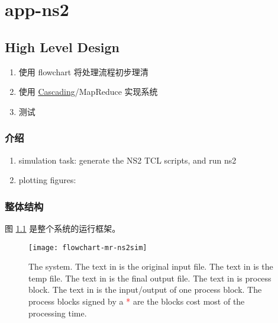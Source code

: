 %

\chapter{app-ns2}

\section{High Level Design}



\begin{enumerate}
  \item 使用 flowchart 将处理流程初步理清
  \item 使用 \href{http://www.cascading.org/}{Cascading}/MapReduce 实现系统
  \item 测试
\end{enumerate}


\subsection{介绍}

\begin{enumerate}
  \item simulation task:
  generate the NS2 TCL scripts, and run ns2

  \item plotting figures:
  
\end{enumerate}


\subsection{整体结构}
图 \ref{fig:system} 是整个系统的运行框架。

\begin{figure}\centering
  \texttt{[image: flowchart-mr-ns2sim]}
  \caption{The system.
    The text in  is the original input file.
    The text in  is the temp file.
    The text in  is the final output file.
    The text in  is process block.
    The text in  is the input/output of one process block.
The process blocks signed by a \textcolor[HTML]{FF0000}{*} are the blocks cost most of the processing time.
  }\label{fig:system}
\end{figure}

